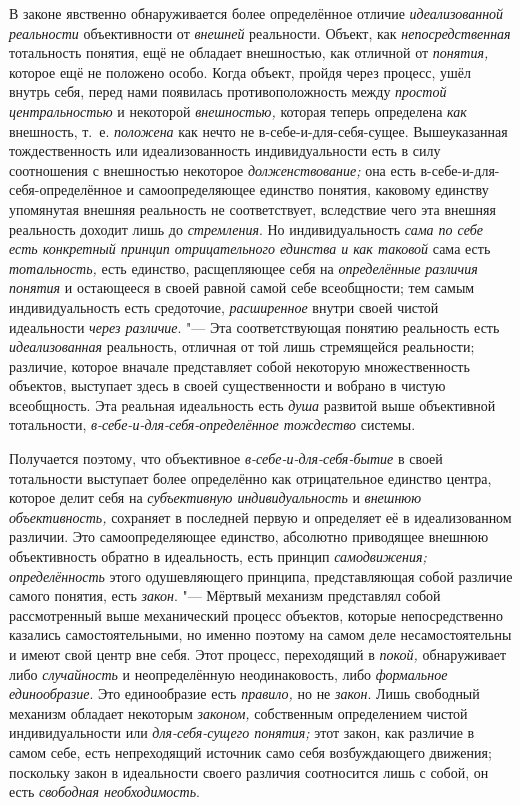В законе явственно обнаруживается более определённое отличие
{\em идеализованной реальности}
объективности от
{\em внешней} реальности.
Объект, как {\em непосредственная}
тотальность понятия, ещё не обладает внешностью, как отличной
от {\em понятия,} которое
ещё не положено особо. Когда объект, пройдя через процесс, ушёл внутрь
себя, перед нами появилась противоположность между
{\em простой центральностью}
и некоторой
{\em внешностью,} которая
теперь определена {\em как}
внешность, т.~е.
{\em положена} как нечто
не в-себе-и-для-себя-сущее. Вышеуказанная тождественность или
идеализованность индивидуальности есть в силу соотношения с внешностью
некоторое {\em долженствование;}
она есть в-себе-и-для-себя-определённое и самоопределяющее
единство понятия, каковому единству упомянутая внешняя реальность не
соответствует, вследствие чего эта внешняя реальность доходит лишь до
{\em стремления}. Но
индивидуальность {\em сама по себе есть
конкретный принцип отрицательного единства и как таковой}
сама есть
{\em тотальность,} есть
единство, расщепляющее себя на
{\em определённые различия понятия}
и остающееся в своей равной самой себе всеобщности; тем самым
индивидуальность есть средоточие,
{\em расширенное} внутри
своей чистой идеальности {\em через
различие}. "--- Эта соответствующая понятию реальность есть
{\em идеализованная}
реальность, отличная от той лишь стремящейся реальности;
различие, которое вначале представляет собой некоторую множественность
объектов, выступает здесь в своей существенности и вобрано в чистую
всеобщность. Эта реальная идеальность есть
{\em душа} развитой выше
объективной тотальности,
{\em в-себе-и-для-себя-определённое
тождество} системы.

Получается поэтому, что объективное
{\em в-себе-и-для-себя-бытие}
в своей тотальности выступает более определённо как
отрицательное единство центра, которое делит себя на
{\em субъективную индивидуальность}
и {\em внешнюю
объективность,} сохраняет в последней первую и определяет её
в идеализованном различии. Это самоопределяющее единство, абсолютно
приводящее внешнюю объективность обратно в идеальность, есть принцип
{\em самодвижения;}
{\em определённость} этого
одушевляющего принципа, представляющая собой различие самого понятия, есть
{\em закон}. "--- Мёртвый
механизм представлял собой рассмотренный выше механический
процесс объектов, которые непосредственно казались самостоятельными, но
именно поэтому на самом деле несамостоятельны и имеют свой центр вне себя.
Этот процесс, переходящий в
{\em покой,} обнаруживает
либо {\em случайность} и
неопределённую неодинаковость, либо
{\em формальное единообразие}.
Это единообразие есть
{\em правило,} но не
{\em закон}. Лишь
свободный механизм обладает некоторым
{\em законом,}
собственным определением чистой индивидуальности или
{\em для-себя-сущего понятия;}
этот закон, как различие в самом себе, есть непреходящий
источник само себя возбуждающего движения; поскольку закон в идеальности
своего различия соотносится лишь с собой, он есть
{\em свободная необходимость}.

